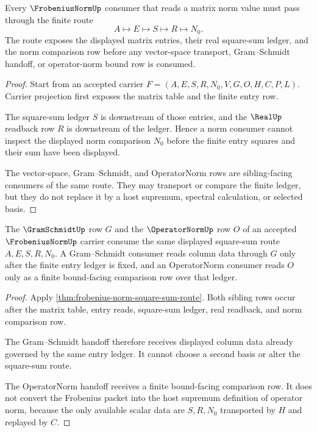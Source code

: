 \begin{theorem}
\label{thm:frobenius-norm-square-sum-route}
Every $\FrobeniusNormUp$ consumer that reads a matrix norm value must pass through the finite route
$$
A \longmapsto E \longmapsto S \longmapsto R \longmapsto N_0 .
$$
The route exposes the displayed matrix entries, their real square-sum ledger, and the norm comparison row before any vector-space transport, Gram--Schmidt handoff, or operator-norm bound row is consumed.
\end{theorem}
\begin{proof}
Start from an accepted carrier $F=(A,E,S,R,N_0,V,G,O,H,C,P,L)$. Carrier projection first exposes the matrix table and the finite entry row.

The square-sum ledger $S$ is downstream of those entries, and the $\RealUp$ readback row $R$ is downstream of the ledger. Hence a norm consumer cannot inspect the displayed norm comparison $N_0$ before the finite entry squares and their sum have been displayed.

The vector-space, Gram--Schmidt, and OperatorNorm rows are sibling-facing consumers of the same route. They may transport or compare the finite ledger, but they do not replace it by a host supremum, spectral calculation, or selected basis.
\end{proof}

\begin{theorem}
\label{thm:frobenius-norm-sibling-compatibility}
The $\GramSchmidtUp$ row $G$ and the $\OperatorNormUp$ row $O$ of an accepted $\FrobeniusNormUp$ carrier consume the same displayed square-sum route $A,E,S,R,N_0$. A Gram--Schmidt consumer reads column data through $G$ only after the finite entry ledger is fixed, and an OperatorNorm consumer reads $O$ only as a finite bound-facing comparison row over that ledger.
\end{theorem}
\begin{proof}
Apply \autoref{thm:frobenius-norm-square-sum-route}. Both sibling rows occur after the matrix table, entry reads, square-sum ledger, real readback, and norm comparison row.

The Gram--Schmidt handoff therefore receives displayed column data already governed by the same entry ledger. It cannot choose a second basis or alter the square-sum route.

The OperatorNorm handoff receives a finite bound-facing comparison row. It does not convert the Frobenius packet into the host supremum definition of operator norm, because the only available scalar data are $S,R,N_0$ transported by $H$ and replayed by $C$.
\end{proof}

